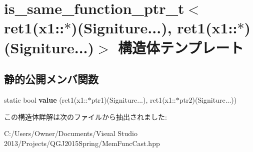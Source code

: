 \hypertarget{structis__same__function__ptr__t_3_01ret1_07x1_1_1_5_08_07_signiture_8_8_8_08_00_01ret1_07x1_1_1_5_08_07_signiture_8_8_8_08_4}{}\section{is\+\_\+same\+\_\+function\+\_\+ptr\+\_\+t$<$ ret1(x1\+:\+:$\ast$)(Signiture...), ret1(x1\+:\+:$\ast$)(Signiture...)$>$ 構造体テンプレート}
\label{structis__same__function__ptr__t_3_01ret1_07x1_1_1_5_08_07_signiture_8_8_8_08_00_01ret1_07x1_1_1_5_08_07_signiture_8_8_8_08_4}
\subsection*{静的公開メンバ関数}
\begin{DoxyCompactItemize}
\item 
static bool {\bfseries value} (ret1(x1\+::$\ast$ptr1)(Signiture...), ret1(x1\+::$\ast$ptr2)(Signiture...))\hypertarget{structis__same__function__ptr__t_3_01ret1_07x1_1_1_5_08_07_signiture_8_8_8_08_00_01ret1_07x1_1_1_5_08_07_signiture_8_8_8_08_4_a541554fdc5855534f9fb50eb4b709a98}{}\label{structis__same__function__ptr__t_3_01ret1_07x1_1_1_5_08_07_signiture_8_8_8_08_00_01ret1_07x1_1_1_5_08_07_signiture_8_8_8_08_4_a541554fdc5855534f9fb50eb4b709a98}

\end{DoxyCompactItemize}


この構造体詳解は次のファイルから抽出されました\+:\begin{DoxyCompactItemize}
\item 
C\+:/\+Users/\+Owner/\+Documents/\+Visual Studio 2013/\+Projects/\+Q\+G\+J2015\+Spring/Mem\+Func\+Cast.\+hpp\end{DoxyCompactItemize}
